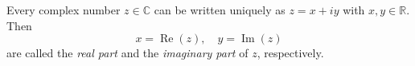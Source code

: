 Every complex number $z \in \mathbb{C}$ can be written uniquely as $z = x + iy$ with $x, y \in \mathbb{R}$. Then
\begin{equation*}
x = \operatorname{Re}(z), \quad y = \operatorname{Im}(z)
\end{equation*}
are called the \textit{real part} and the \textit{imaginary part} of $z$, respectively.

